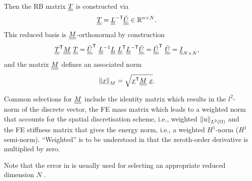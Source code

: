Then the RB matrix $\underline{\underline{T}}$ is constructed via
\begin{equation}
	\underline{\underline{T}} = {\underline{\underline{L}}}^{\sf -T} \underline{\underline{{\tilde{U}}}} \in {\mathbb{ R}}^{n \times N}.
	\label{eq:normalising}
\end{equation}
This reduced basis is $\underline{\underline{M}}$-orthonormal by construction
\begin{equation}
	{\underline{\underline{T}}}^{\sf T} \underline{\underline{M}} \ \underline{\underline{T}} =
	{\underline{\underline{ {{\tilde{U}}}}}}^{\sf T} \ {\underline{\underline{L}}}^{\rm -1} {\underline{\underline{L}}} \ {\underline{\underline{L}}}^{\sf T} {\underline{\underline{L}}}^{\sf -T} \underline{\underline{{{\tilde{U}}}}}
	= {\underline{\underline{ {{\tilde{U}}}}}}^{\sf T} \  \underline{\underline{{{\tilde{U}}}}} = \underline{\underline{I}}_{N \times N},
\end{equation}
and the matrix $\underline{\underline{M}}$ defines an associated norm
\begin{equation}
	\left\lVert \underline{x} \right\rVert_{M}=\sqrt{{\underline{x}}^{\sf T} \underline{\underline{M}} \ \underline{x}}.
\end{equation}

Common selections for $\underline{\underline{M}}$ include the identity matrix which results in the $l^2$-norm of the discrete vector, the FE mass matrix which leads to a weighted norm that accounts for the spatial discretisation scheme, i.e., weighted $\left\lVert {u} \right\rVert_{L^2(\Omega)}$ and the FE stiffness matrix that gives the energy norm, i.e., a weighted $H^1$-norm ($H^1$ semi-norm). “Weighted” is to be understood in that the zeroth-order derivative is multiplied by zero.

Note that the error in  is usually used for selecting an appropriate reduced dimension $N$ \parencite{fritzen2016MOR}.


